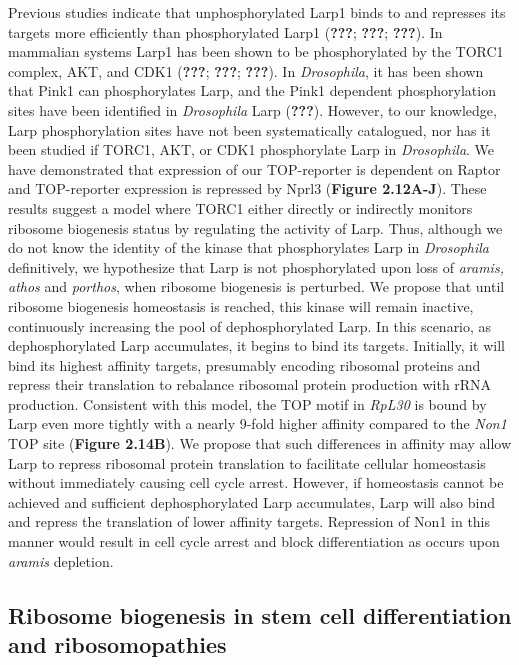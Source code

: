 \documentclass[12pt,oneside]{reedthesis}
\begin{document}
Previous studies indicate that unphosphorylated Larp1 binds to and represses its targets more efficiently than phosphorylated Larp1 ({\textbf{???}}; {\textbf{???}}; {\textbf{???}}). In mammalian systems Larp1 has been shown to be phosphorylated by the TORC1 complex, AKT, and CDK1 ({\textbf{???}}; {\textbf{???}}; {\textbf{???}}). In \emph{Drosophila}, it has been shown that Pink1 can phosphorylates Larp, and the Pink1 dependent phosphorylation sites have been identified in \emph{Drosophila} Larp ({\textbf{???}}). However, to our knowledge, Larp phosphorylation sites have not been systematically catalogued, nor has it been studied if TORC1, AKT, or CDK1 phosphorylate Larp in \emph{Drosophila}. We have demonstrated that expression of our TOP-reporter is dependent on Raptor and TOP-reporter expression is repressed by Nprl3 (\textbf{Figure 2.12A-J}). These results suggest a model where TORC1 either directly or indirectly monitors ribosome biogenesis status by regulating the activity of Larp. Thus, although we do not know the identity of the kinase that phosphorylates Larp in \emph{Drosophila} definitively, we hypothesize that Larp is not phosphorylated upon loss of \emph{aramis, athos} and \emph{porthos}, when ribosome biogenesis is perturbed. We propose that until ribosome biogenesis homeostasis is reached, this kinase will remain inactive, continuously increasing the pool of dephosphorylated Larp. In this scenario, as dephosphorylated Larp accumulates, it begins to bind its targets. Initially, it will bind its highest affinity targets, presumably encoding ribosomal proteins and repress their translation to rebalance ribosomal protein production with rRNA production. Consistent with this model, the TOP motif in \emph{RpL30} is bound by Larp even more tightly with a nearly 9-fold higher affinity compared to the \emph{Non1} TOP site (\textbf{Figure 2.14B}). We propose that such differences in affinity may allow Larp to repress ribosomal protein translation to facilitate cellular homeostasis without immediately causing cell cycle arrest. However, if homeostasis cannot be achieved and sufficient dephosphorylated Larp accumulates, Larp will also bind and repress the translation of lower affinity targets. Repression of Non1 in this manner would result in cell cycle arrest and block differentiation as occurs upon \emph{aramis} depletion.

\hypertarget{ribosome-biogenesis-in-stem-cell-differentiation-and-ribosomopathies}{%
\subsection{Ribosome biogenesis in stem cell differentiation and ribosomopathies}\label{ribosome-biogenesis-in-stem-cell-differentiation-and-ribosomopathies}}
\end{document}
